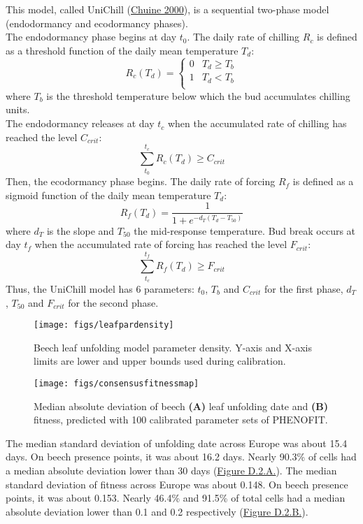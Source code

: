 \documentclass[11pt,]{article}
\begin{document}
This model, called UniChill (\protect\hyperlink{ref-Chuine2000}{Chuine
2000}), is a sequential two-phase model (endodormancy and ecodormancy
phases).\\
The endodormancy phase begins at day \(t_0\). The daily rate of chilling
\(R_c\) is defined as a threshold function of the daily mean temperature
\(T_d\): \[ R_c(T_d) = \left\{
\begin{array}{ll}
      0 & T_d \geq T_b \\
      1 & T_d < T_b \\
\end{array} 
\right. \] where \(T_b\) is the threshold temperature below which the
bud accumulates chilling units.\\
The endodormancy releases at day \(t_c\) when the accumulated rate of
chilling has reached the level \(C_{crit}\):
\[\sum\limits_{t_0}^{t_c} R_c(T_d) \geq C_{crit} \] Then, the
ecodormancy phase begins. The daily rate of forcing \(R_f\) is defined
as a sigmoid function of the daily mean temperature \(T_d\):
\[R_f(T_d) = \frac{1}{1 + e^{-d_T(T_d-T_{50})}} \] where \(d_T\) is the
slope and \(T_{50}\) the mid-response temperature. Bud break occurs at
day \(t_f\) when the accumulated rate of forcing has reached the level
\(F_{crit}\): \[\sum\limits_{t_c}^{t_f} R_f(T_d) \geq F_{crit} \] Thus,
the UniChill model has 6 parameters: \(t_0\), \(T_b\) and \(C_{crit}\)
for the first phase, \(d_T\), \(T_{50}\) and \(F_{crit}\) for the second
phase.

\begin{figure}[H]

{\centering \texttt{[image: figs/leafpardensity]} 

}

\caption{Beech leaf unfolding model parameter density. Y-axis and X-axis limits are lower and upper bounds used during calibration.}\label{fig:leafpardensity}
\end{figure}

\begin{figure}[H]

{\centering \texttt{[image: figs/consensusfitnessmap]} 

}

\caption{Median absolute deviation of beech \textbf{(A)} leaf unfolding date and \textbf{(B)} fitness, predicted with 100 calibrated parameter sets of PHENOFIT.}\label{fig:consensusfitnessmap}
\end{figure}

The median standard deviation of unfolding date across Europe was about
15.4 days. On beech presence points, it was about 16.2 days. Nearly
90.3\% of cells had a median absolute deviation lower than 30 days
(\hyperref[fig:consensusfitnessmap]{Figure D.2.A.}). The median standard
deviation of fitness across Europe was about 0.148. On beech presence
points, it was about 0.153. Nearly 46.4\% and 91.5\% of total cells had
a median absolute deviation lower than 0.1 and 0.2 respectively
(\hyperref[fig:consensusfitnessmap]{Figure D.2.B.}).
\end{document}
